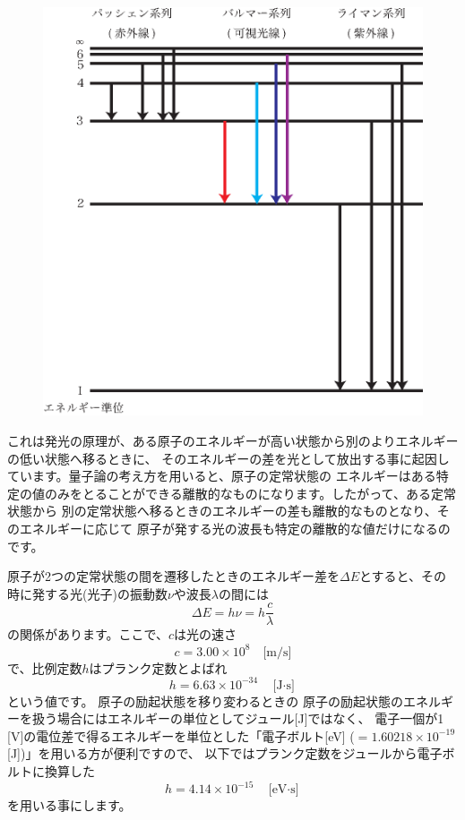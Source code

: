 \begin{figure}
\vspace*{-0.8cm}
\includegraphics[scale=0.65]{12_Spectrum/state.eps}\\
\hspace{0.5cm}{\small 水素原子のエネルギー準位とスペクトル}
\end{figure}


これは発光の原理が、ある原子のエネルギーが高い状態から別のよりエネルギーの低い状態へ移るときに、
そのエネルギーの差を光として放出する事に起因しています。量子論の考え方を用いると、原子の定常状態の
エネルギーはある特定の値のみをとることができる離散的なものになります。したがって、ある定常状態から
別の定常状態へ移るときのエネルギーの差も離散的なものとなり、そのエネルギーに応じて
原子が発する光の波長も特定の離散的な値だけになるのです。

原子が2つの定常状態の間を遷移したときのエネルギー差を$\Delta E$とすると、その時に発する光(光子)の振動数$\nu$や波長$\lambda$の間には
\begin{equation}
\Delta E=h\nu=h\frac{c}{\lambda}
\label{Planck}
\end{equation}
の関係があります。ここで、$c$は光の速さ
\[
c = 3.00 \times 10^{8} \quad \text{[m/s]}
\]
で、比例定数$h$はプランク定数とよばれ
\[
h = 6.63 \times 10^{-34} \quad \text{[J$\cdot$s]}
\]
という値です。
原子の励起状態を移り変わるときの
原子の励起状態のエネルギーを扱う場合にはエネルギーの単位としてジュール[J]ではなく、
電子一個が1 [V]の電位差で得るエネルギーを単位とした「電子ボルト[eV] ($=1.60218\times 10^{-19}$ [J])」を用いる方が便利ですので、
以下ではプランク定数をジュールから電子ボルトに換算した
\[
h = 4.14 \times 10^{-15} \quad \text{[eV$\cdot$s]}
\]
を用いる事にします。

